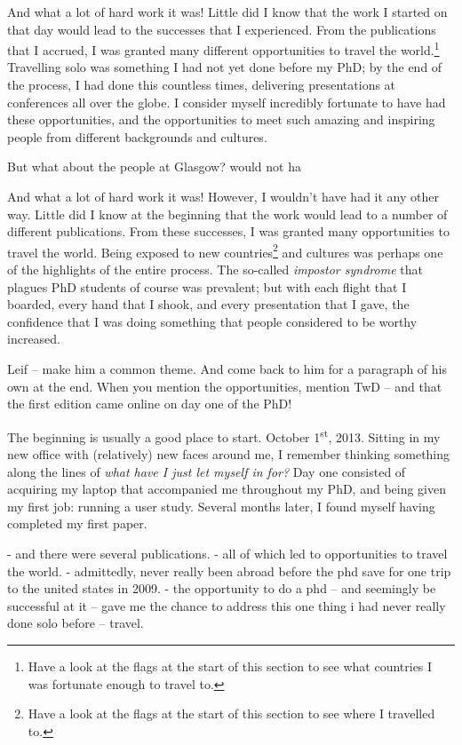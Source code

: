 \begin{preamble}
And what a lot of hard work it was! Little did I know that the work I started on that day would lead to the successes that I experienced. From the publications that I accrued, I was granted many different opportunities to travel the world.\footnote{Have a look at the flags at the start of this section to see what countries I was fortunate enough to travel to.} Travelling solo was something I had not yet done before my PhD; by the end of the process, I had done this countless times, delivering presentations at conferences all over the globe. I consider myself incredibly fortunate to have had these opportunities, and the opportunities to meet such amazing and inspiring people from different backgrounds and cultures.

But what about the people at Glasgow?  would not ha


\todo{====}


And what a lot of hard work it was! However, I wouldn't have had it any other way. Little did I know at the beginning that the work would lead to a number of different publications. From these successes, I was granted many opportunities to travel the world. Being exposed to new countries\footnote{Have a look at the flags at the start of this section to see where I travelled to.} and cultures was perhaps one of the highlights of the entire process. The so-called \emph{impostor syndrome} that plagues PhD students of course was prevalent; but with each flight that I boarded, every hand that I shook, and every presentation that I gave, the confidence that I was doing something that people considered to be worthy increased.




\todo{======}

Leif -- make him a common theme. And come back to him for a paragraph of his own at the end. When you mention the opportunities, mention TwD -- and that the first edition came online on day one of the PhD!

The beginning is usually a good place to start. October 1\textsuperscript{st}, 2013. Sitting in my new office with (relatively) new faces around me, I remember thinking something along the lines of \emph{what have I just let myself in for?} Day one consisted of acquiring my laptop that accompanied me throughout my PhD, and being given my first job: running a user study. Several months later, I found myself having completed my first paper.

- and there were several publications.
- all of which led to opportunities to travel the world.
- admittedly, never really been abroad before the phd save for one trip to the united states in 2009.
- the opportunity to do a phd -- and seemingly be successful at it -- gave me the chance to address this one thing i had never really done solo before -- travel.


\end{preamble}

